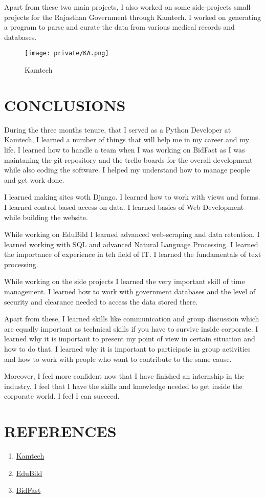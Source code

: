 \documentclass[14pt]{extarticle}
\begin{document}
Apart from these two main projects, I also worked on some side-projects small projects for the Rajasthan Government through Kamtech. I worked on generating a program to parse and curate the data from various medical records and databases.

\begin{figure}[hbp]
    \centering
    \caption{Kamtech}
    \texttt{[image: private/KA.png]}
\end{figure}


\newpage
\section{CONCLUSIONS}

During the three months tenure, that I served as a Python Developer at Kamtech, I learned a number of things that will help me in my career and my life. I learned how to handle a team when I was working on BidFast as I was maintaning the git repository and the trello boards for the overall development while also coding the software. I helped my understand how to manage people and get work done.

I learned making sites woth Django. I learned how to work with views and forms. I learned control based access on data. I learned basics of Web Development while building the website.

While working on EduBild I learned advanced web-scraping and data retention. I learned working with SQL and advanced Natural Language Processing. I learned the importance of experience in teh field of IT. I learned the fundamentals of text processing.

While working on the side projects I learned the very important skill of time management. I learned how to work with government databases and the level of security and clearance needed to access the data stored there.

Apart from these, I learned skills like communication and group discussion which are equally important as technical skills if you have to survive inside corporate. I learned why it is important to present my point of view in certain situation and how to do that. I learned why it is important to participate in group activities and how to work with people who want to contribute to the same cause.

Moreover, I feel more confident now that I have finished an internship in the industry. I feel that I have the skills and knowledge needed to get inside the corporate world. I feel I can succeed.

\newpage
{}
\section*{REFERENCES}
\begin{enumerate}
    \item \href{https://www.kamtech.in/}{Kamtech}
    \item \href{https://www.edubild.com/}{EduBild}
    \item \href{https://edubild.com/bidfast/}{BidFast}
\end{enumerate}
\end{document}
